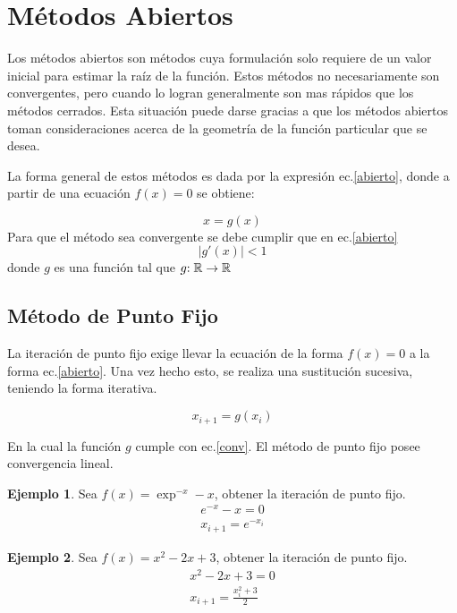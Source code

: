 \documentclass[letterpaper,10pt,oneside]{sphinxmanual}
\theoremstyle{plain}%
\theoremstyle{definition}%
\newtheorem{ejemplo}{Ejemplo}[chapter]
\theoremstyle{remark}%
\newcommand{\modulo}[1]{\left | #1 \right |}
\newcommand{\f}[3]{#1 \negthickspace : #2 \to #3}
\begin{document}
\section{Métodos Abiertos}

\noindent Los métodos abiertos son métodos cuya formulación solo requiere de un valor inicial para estimar la raíz de la función. Estos métodos no necesariamente son convergentes, pero cuando lo logran generalmente son mas rápidos que los métodos cerrados. Esta situación puede darse gracias a que los métodos abiertos toman consideraciones acerca de la geometría de la función particular que se desea.\medskip

\noindent La forma general de estos métodos es dada por la expresión ec.\ref{abierto}, donde a partir de una ecuación $f(x)=0$ se obtiene:\medskip

\begin{equation}
 x=g(x) \label{abierto} 
\end{equation}
Para que el método sea convergente se debe cumplir que en ec.\ref{abierto} 
\begin{equation}
 \modulo{g\prime(x)}<1 \label{conv}
\end{equation}
donde $g$ es una función tal que $\f{g}{\mathbb{R}}{\mathbb{R}}$

\subsection{Método de Punto Fijo}

\noindent La iteración de punto fijo exige llevar la ecuación de la forma $f(x)=0$ a la forma ec.\ref{abierto}. Una vez hecho esto, se realiza una sustitución sucesiva, teniendo la forma iterativa.\medskip

\begin{equation}
 x_{i+1}=g(x_{i}) \label{fijo}
\end{equation}

\noindent En la cual la función $g$ cumple con ec.\ref{conv}. El método de punto fijo posee convergencia lineal.\medskip

\begin{ejemplo}
\noindent Sea $f(x)=\exp^{-x}-x$, obtener la iteración de punto fijo.
\begin{eqnarray*}
 e^{-x}-x=0 \\
x_{i+1}=e^{-x_{i}}
\end{eqnarray*}
\end{ejemplo}
\begin{ejemplo}
\noindent Sea $f(x)=x^{2}-2x+3$, obtener la iteración de punto fijo.
\begin{eqnarray*}
x^{2}-2x+3=0 \\
x_{i+1}=\frac{x_{i}^{2}+3}{2}
\end{eqnarray*}
\end{ejemplo}
\end{document}
